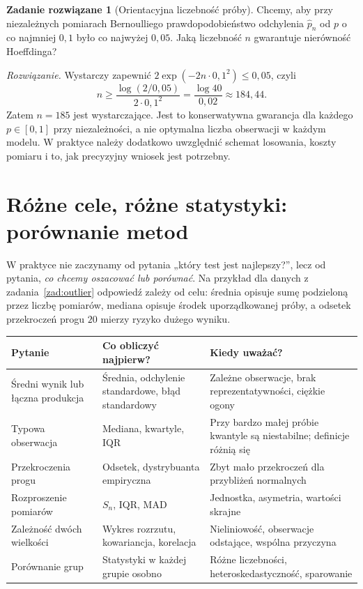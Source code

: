 \documentclass[11pt,a4paper,oneside]{report}
\numberwithin{equation}{chapter}
\theoremstyle{plain}
\theoremstyle{definition}
\newtheorem{zadanie}{Zadanie rozwiązane}[chapter]
\theoremstyle{remark}
\begin{document}
\begin{zadanie}[Orientacyjna liczebność próby]\label{zad:sample-size}
Chcemy, aby przy niezależnych pomiarach Bernoulliego prawdopodobieństwo odchylenia $\widehat p_n$ od $p$ o co najmniej $0{,}1$ było co najwyżej $0{,}05$. Jaką liczebność $n$ gwarantuje nierówność Hoeffdinga?
\par\emph{Rozwiązanie.} Wystarczy zapewnić $2\exp(-2n\cdot0{,}1^2)\le0{,}05$, czyli
\[
n\ge\frac{\log(2/0{,}05)}{2\cdot0{,}1^2}=\frac{\log40}{0{,}02}\approx184{,}44.
\]
Zatem $n=185$ jest wystarczające. Jest to konserwatywna gwarancja dla każdego $p\in[0,1]$ przy niezależności, a nie optymalna liczba obserwacji w każdym modelu. W praktyce należy dodatkowo uwzględnić schemat losowania, koszty pomiaru i to, jak precyzyjny wniosek jest potrzebny.
\end{zadanie}

\section{Różne cele, różne statystyki: porównanie metod}\label{sec:choose-stats}
W praktyce nie zaczynamy od pytania „który test jest najlepszy?”, lecz od pytania, \emph{co chcemy oszacować lub porównać}. Na przykład dla danych z zadania~\ref{zad:outlier} odpowiedź zależy od celu: średnia opisuje sumę podzieloną przez liczbę pomiarów, mediana opisuje środek uporządkowanej próby, a odsetek przekroczeń progu $20$ mierzy ryzyko dużego wyniku.

\begin{center}\small
\begin{tabular}{>{\raggedright\arraybackslash}p{}>{\raggedright\arraybackslash}p{}>{\raggedright\arraybackslash}p{}}
\toprule
\textbf{Pytanie} & \textbf{Co obliczyć najpierw?} & \textbf{Kiedy uważać?}\\
\midrule
Średni wynik lub łączna produkcja & Średnia, odchylenie standardowe, błąd standardowy & Zależne obserwacje, brak reprezentatywności, ciężkie ogony\\
Typowa obserwacja & Mediana, kwartyle, IQR & Przy bardzo małej próbie kwantyle są niestabilne; definicje różnią się\\
Przekroczenia progu & Odsetek, dystrybuanta empiryczna & Zbyt mało przekroczeń dla przybliżeń normalnych\\
Rozproszenie pomiarów & $S_n$, IQR, MAD & Jednostka, asymetria, wartości skrajne\\
Zależność dwóch wielkości & Wykres rozrzutu, kowariancja, korelacja & Nieliniowość, obserwacje odstające, wspólna przyczyna\\
Porównanie grup & Statystyki w każdej grupie osobno & Różne liczebności, heteroskedastyczność, sparowanie\\
\bottomrule
\end{tabular}
\end{center}
\end{document}
